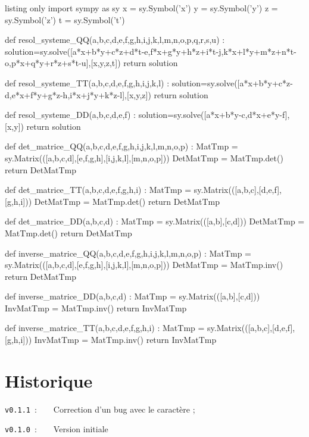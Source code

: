 \documentclass[a4paper,11pt]{article}
\begin{document}
\begin{PresentationCodePython}{listing only}
import sympy as sy
x = sy.Symbol('x')
y = sy.Symbol('y')
z = sy.Symbol('z')
t = sy.Symbol('t')

def resol_systeme_QQ(a,b,c,d,e,f,g,h,i,j,k,l,m,n,o,p,q,r,s,u) :
	solution=sy.solve([a*x+b*y+c*z+d*t-e,f*x+g*y+h*z+i*t-j,k*x+l*y+m*z+n*t-o,p*x+q*y+r*z+s*t-u],[x,y,z,t])
	return solution

def resol_systeme_TT(a,b,c,d,e,f,g,h,i,j,k,l) :
	solution=sy.solve([a*x+b*y+c*z-d,e*x+f*y+g*z-h,i*x+j*y+k*z-l],[x,y,z])
	return solution

def resol_systeme_DD(a,b,c,d,e,f) :
	solution=sy.solve([a*x+b*y-c,d*x+e*y-f],[x,y])
	return solution

def det_matrice_QQ(a,b,c,d,e,f,g,h,i,j,k,l,m,n,o,p) :
	MatTmp = sy.Matrix(([a,b,c,d],[e,f,g,h],[i,j,k,l],[m,n,o,p]))
	DetMatTmp = MatTmp.det()
	return DetMatTmp

def det_matrice_TT(a,b,c,d,e,f,g,h,i) :
	MatTmp = sy.Matrix(([a,b,c],[d,e,f],[g,h,i]))
	DetMatTmp = MatTmp.det()
	return DetMatTmp

def det_matrice_DD(a,b,c,d) :
	MatTmp = sy.Matrix(([a,b],[c,d]))
	DetMatTmp = MatTmp.det()
	return DetMatTmp

def inverse_matrice_QQ(a,b,c,d,e,f,g,h,i,j,k,l,m,n,o,p) :
	MatTmp = sy.Matrix(([a,b,c,d],[e,f,g,h],[i,j,k,l],[m,n,o,p]))
	DetMatTmp = MatTmp.inv()
	return DetMatTmp

def inverse_matrice_DD(a,b,c,d) :
	MatTmp = sy.Matrix(([a,b],[c,d]))
	InvMatTmp = MatTmp.inv()
	return InvMatTmp

def inverse_matrice_TT(a,b,c,d,e,f,g,h,i) :
	MatTmp = sy.Matrix(([a,b,c],[d,e,f],[g,h,i]))
	InvMatTmp = MatTmp.inv()
	return InvMatTmp
\end{PresentationCodePython}

\pagebreak

\part{Historique}

\verb|v0.1.1|~:~~~~Correction d'un bug avec le caractère \og ; \fg{}

\verb|v0.1.0|~:~~~~Version initiale
\end{document}

